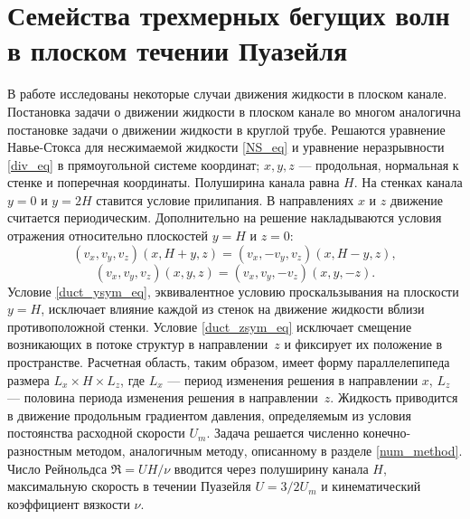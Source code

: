 \begin{comment}
Re2200ub:
lin: cf = 0.44473618074359494, lambda = -0.0085
vwz: cf = 0.6470799307435949, lambda = -0.021

Re1700ub:
lin: cf = 0.633021694959945, lambda = -0.02
vwz: cf = 0.651179838899339, lambda = -0.028 (unsym)
        Осесимметричное возмущение, lambda = -0.028
\end{comment}

\section{Семейства трехмерных бегущих волн в плоском течении Пуазейля} \label{ductTW_seq}

В работе исследованы некоторые случаи движения жидкости в плоском канале. Постановка задачи о движении жидкости в плоском канале во многом аналогична постановке задачи о движении жидкости в круглой трубе. Решаются уравнение Навье-Стокса для несжимаемой жидкости \eqref{NS_eq} и уравнение неразрывности \eqref{div_eq} в прямоугольной системе координат; $x, y, z$ --- продольная, нормальная к стенке и поперечная координаты. Полуширина канала равна $H$. На стенках канала $y = 0$ и $y = 2H$ ставится условие прилипания. В направлениях $x$ и $z$ движение считается периодическим. Дополнительно на решение накладываются условия отражения относительно плоскостей $y = H$ и $z = 0$:
\begin{equation} \label{duct_ysym_eq}
(v_x, v_y, v_z)(x, H+y, z) = (v_x, -v_y, v_z)(x, H-y, z),
\end{equation} 
\begin{equation} \label{duct_zsym_eq}
(v_x, v_y, v_z)(x, y, z) = (v_x, v_y, -v_z)(x, y, -z). 
\end{equation} 
Условие \eqref{duct_ysym_eq}, эквивалентное условию проскальзывания на плоскости $y = H$, исключает влияние каждой из стенок на движение жидкости вблизи противоположной стенки. Условие \eqref{duct_zsym_eq} исключает смещение возникающих в потоке структур в направлении~$z$ и фиксирует их положение в пространстве. Расчетная область, таким образом, имеет форму параллелепипеда размера $L_x \times H \times L_z$, где $L_x$ --- период изменения решения в направлении $x$, $L_z$ --- половина периода изменения решения в направлении~$z$. Жидкость приводится в движение продольным градиентом давления, определяемым из условия постоянства расходной скорости $U_m$. Задача решается численно конечно-разностным методом, аналогичным методу, описанному в разделе \ref{num_method}. Число Рейнольдса $\Re = UH/\nu$ вводится через полуширину канала $H$, максимальную скорость в течении Пуазейля $U = 3/2U_m$ и кинематический коэффициент вязкости $\nu$. 

